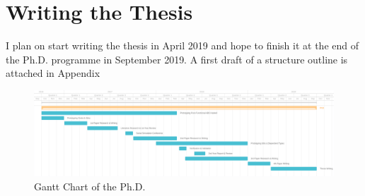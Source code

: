 \section{Writing the Thesis}
I plan on start writing the thesis in April 2019 and hope to finish it at the end of the Ph.D. programme in September 2019. A first draft of a structure outline is attached in Appendix 

\clearpage

\begin{landscape}
	\label{fig:gantt}
	\centering
	
	\begin{figure}
	\centering
	\includegraphics[width=1.5\textwidth, height=0.8\textwidth, angle=0]{./fig/phd_gantt.png}
	\caption{Gantt Chart of the Ph.D.}
	\label{fig:gantt}
\end{figure}
\end{landscape}